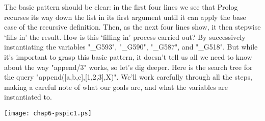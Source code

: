 The basic pattern should be clear: in the first four lines we see that
Prolog recurses its way down the list in its first argument until it
can apply the base case of the recursive definition.  Then, as the
next four lines show, it then stepwise `fills in' the result.  How is
this `filling in' process carried out?  By successively instantiating
the variables "\_G593", "\_G590", "\_G587", and
"\_G518". But while it's important to grasp this basic pattern, it
doesn't tell us all we need to know about the way "append/3" works,
so let's dig deeper. Here is the search tree for the query
"append([a,b,c],[1,2,3],X)". We'll work carefully through
all the steps, making a careful note of what our goals are,
and what the variables are instantiated to.

\begin{center}
\texttt{[image: chap6-pspic1.ps]}
\end{center}


